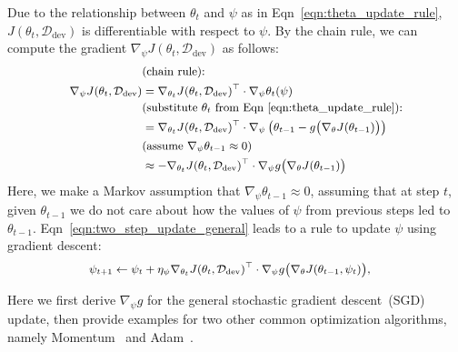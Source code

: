 Due to the relationship between $\theta_t$ and $\psi$ as in Eqn~\ref{eqn:theta_update_rule}, $J(\theta_t, \mathcal{D}_\text{dev})$ is differentiable with respect to $\psi$. 
By the chain rule, we can compute the gradient $\nabla_\psi J(\theta_t, \mathcal{D}_\text{dev})$ as follows:
\begin{equation}
  \label{eqn:two_step_update_general}
   \small
  \begin{aligned}
      &\text{(chain rule):} \\
    \nabla_\psi J(\theta_t, \mathcal{D}_\text{dev})
      &= \nabla_{\theta_t} J(\theta_t, \mathcal{D}_\text{dev})^\top \cdot \nabla_\psi \theta_t(\psi) \\
      &\text{(substitute $\theta_t$ from Eqn~\ref{eqn:theta_update_rule}):} \\
      &= \nabla_{\theta_t} J(\theta_t, \mathcal{D}_\text{dev})^\top \cdot \nabla_\psi \left( \theta_{t-1} - g\big( \nabla_\theta J(\theta_{t-1}) \big) \right) \\
      &\text{(assume $\nabla_\psi \theta_{t-1} \approx 0$)} \\
      &\approx -\nabla_{\theta_t} J(\theta_t, \mathcal{D}_\text{dev})^\top \cdot \nabla_\psi g\big( \nabla_\theta J(\theta_{t-1}) \big)  %
  \end{aligned}
\end{equation}
Here, we make a Markov assumption that $\nabla_\psi \theta_{t-1} \approx 0$, assuming that at step $t$, given $\theta_{t-1}$ we do not care about how the values of $\psi$ from previous steps led to $\theta_{t-1}$. Eqn~\ref{eqn:two_step_update_general} leads to a rule to update $\psi$ using gradient descent:
\begin{equation}
  \label{eqn:psi_update_rule}
   \small
  \begin{aligned}
    \psi_{t+1} 
      &\leftarrow \psi_t + \eta_\psi \nabla_{\theta_t} J(\theta_t, \mathcal{D}_\text{dev})^\top \cdot \nabla_\psi g\big( \nabla_\theta J(\theta_{t-1}, \psi_t) \big),
  \end{aligned}
\end{equation}


Here we first derive $\nabla_\psi g$ for the general stochastic gradient descent~(SGD) update, then provide examples for two other common optimization algorithms, namely Momentum~\citep{nesterov} and Adam~\citep{adam}.

